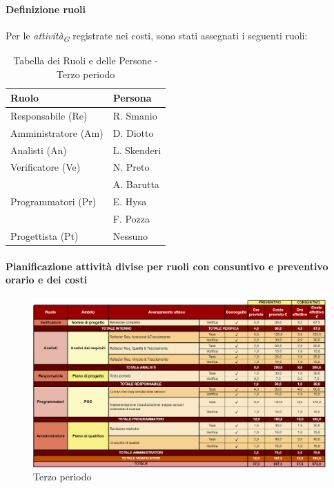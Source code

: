 \paragraph{Definizione ruoli} 
Per le \textit{attività}\textsubscript{\textit{G}} registrate nei costi, sono stati assegnati i seguenti ruoli:  

\vspace{0.4cm}

\begin{table}[H]
    \centering
    \begin{tabular}{|L{4cm}|L{2cm}|}
    \hline
    \textbf{Ruolo} & \textbf{Persona} \\
    \hline
    \hline
    Responsabile (Re)   & R. Smanio \\
    \hline
    Amministratore (Am) & D. Diotto \\
    \hline
    Analisti (An)       & L. Skenderi \\
    \hline
    Verificatore (Ve)   & N. Preto \\
                        & A. Barutta \\
    \hline
    Programmatori (Pr)  & E. Hysa \\
                        & F. Pozza \\
    \hline
    Progettista (Pt)    & Nessuno \\
    \hline
    \end{tabular}
    \caption{Tabella dei Ruoli e delle Persone - Terzo periodo}
    \label{tab:Ruoli_persone_3}
    \end{table}

\newpage
\paragraph{Pianificazione attività divise per ruoli con consuntivo e preventivo orario e dei costi}

\begin{figure}[H]
    \centering
    \includegraphics[width=\linewidth, height=0.9\textheight, keepaspectratio]{../Images/periodo3.PNG}
    \caption{Terzo periodo}
    \label{fig:Terzo_periodo}
\end{figure}

